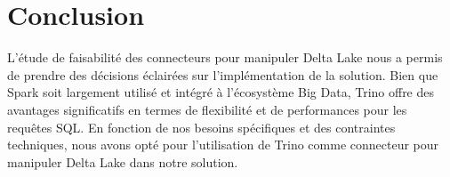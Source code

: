 \section*{Conclusion}
L'étude de faisabilité des connecteurs pour manipuler Delta Lake nous a permis de prendre des décisions éclairées sur l'implémentation de la solution. Bien que Spark soit largement utilisé et intégré à l'écosystème Big Data, Trino offre des avantages significatifs en termes de flexibilité et de performances pour les requêtes SQL. En fonction de nos besoins spécifiques et des contraintes techniques, nous avons opté pour l'utilisation de Trino comme connecteur pour manipuler Delta Lake dans notre solution.
